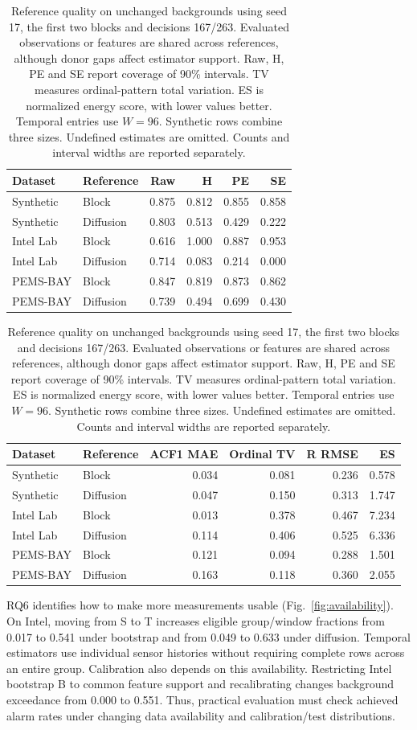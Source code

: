 \documentclass{llncs}
\begin{document}
\begin{table}[!tbp]
\centering\small
\caption{Reference quality on unchanged backgrounds using seed 17, the
first two blocks and decisions 167/263. Evaluated observations or features
are shared across references, although donor gaps affect estimator support.
Raw, H, PE and SE report coverage of 90\% intervals. TV measures ordinal-pattern
total variation. ES is normalized energy score, with lower values better.
Temporal entries use $W=96$. Synthetic rows combine three sizes.
Undefined estimates are omitted. Counts and interval widths are reported separately.}
\label{tab:fidelity}
\begin{tabular}{llrrrr}\toprule
Dataset&Reference&Raw&H&PE&SE\\\midrule
Synthetic & Block & 0.875 & 0.812 & 0.855 & 0.858 \\
Synthetic & Diffusion & 0.803 & 0.513 & 0.429 & 0.222 \\
Intel Lab & Block & 0.616 & 1.000 & 0.887 & 0.953 \\
Intel Lab & Diffusion & 0.714 & 0.083 & 0.214 & 0.000 \\
PEMS-BAY & Block & 0.847 & 0.819 & 0.873 & 0.862 \\
PEMS-BAY & Diffusion & 0.739 & 0.494 & 0.699 & 0.430 \\
\bottomrule
\end{tabular}
\par\medskip
\begin{tabular}{llrrrr}\toprule
Dataset&Reference&ACF1 MAE&Ordinal TV&R RMSE&ES\\\midrule
Synthetic & Block & 0.034 & 0.081 & 0.236 & 0.578 \\
Synthetic & Diffusion & 0.047 & 0.150 & 0.313 & 1.747 \\
Intel Lab & Block & 0.013 & 0.378 & 0.467 & 7.234 \\
Intel Lab & Diffusion & 0.114 & 0.406 & 0.525 & 6.336 \\
PEMS-BAY & Block & 0.121 & 0.094 & 0.288 & 1.501 \\
PEMS-BAY & Diffusion & 0.163 & 0.118 & 0.360 & 2.055 \\
\bottomrule
\end{tabular}
\end{table}

RQ6 identifies how to make more measurements usable (Fig.~\ref{fig:availability}).
On Intel, moving from S to T increases eligible group/window fractions
from 0.017 to 0.541 under bootstrap and from 0.049 to 0.633 under diffusion.
Temporal estimators use individual sensor histories without requiring complete
rows across an entire group. Calibration also depends on this availability.
Restricting Intel bootstrap B to common feature support and recalibrating
changes background exceedance from 0.000 to 0.551. Thus, practical evaluation
must check achieved alarm rates under changing data availability and
calibration/test distributions.
\end{document}
